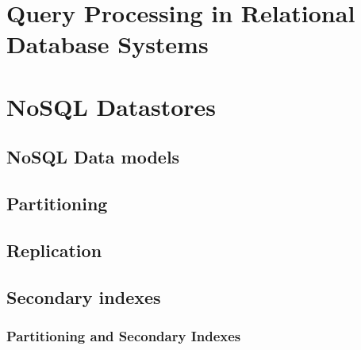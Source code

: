 \section{Query Processing in Relational Database Systems}

\section{NoSQL Datastores}

\subsection{NoSQL Data models}

\subsection{Partitioning}

\subsection{Replication}

\subsection{Secondary indexes}

\subsubsection{Partitioning and Secondary Indexes}